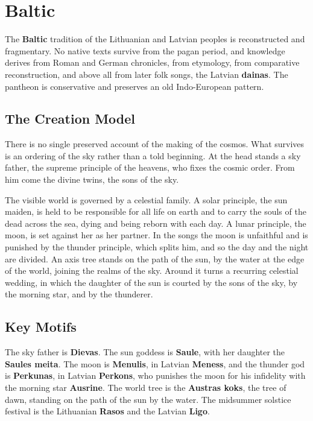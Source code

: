 \section{Baltic}

The \textbf{Baltic} tradition of the Lithuanian and Latvian peoples is reconstructed and fragmentary. No native texts survive from the pagan period, and knowledge derives from Roman and German chronicles, from etymology, from comparative reconstruction, and above all from later folk songs, the Latvian \textbf{dainas}. The pantheon is conservative and preserves an old Indo-European pattern.

\subsection{The Creation Model}

There is no single preserved account of the making of the cosmos. What survives is an ordering of the sky rather than a told beginning. At the head stands a sky father, the supreme principle of the heavens, who fixes the cosmic order. From him come the divine twins, the sons of the sky.

The visible world is governed by a celestial family. A solar principle, the sun maiden, is held to be responsible for all life on earth and to carry the souls of the dead across the sea, dying and being reborn with each day. A lunar principle, the moon, is set against her as her partner. In the songs the moon is unfaithful and is punished by the thunder principle, which splits him, and so the day and the night are divided. An axis tree stands on the path of the sun, by the water at the edge of the world, joining the realms of the sky. Around it turns a recurring celestial wedding, in which the daughter of the sun is courted by the sons of the sky, by the morning star, and by the thunderer.

\subsection{Key Motifs}

The sky father is \textbf{Dievas}. The sun goddess is \textbf{Saule}, with her daughter the \textbf{Saules meita}. The moon is \textbf{Menulis}, in Latvian \textbf{Meness}, and the thunder god is \textbf{Perkunas}, in Latvian \textbf{Perkons}, who punishes the moon for his infidelity with the morning star \textbf{Ausrine}. The world tree is the \textbf{Austras koks}, the tree of dawn, standing on the path of the sun by the water. The midsummer solstice festival is the Lithuanian \textbf{Rasos} and the Latvian \textbf{Ligo}.

